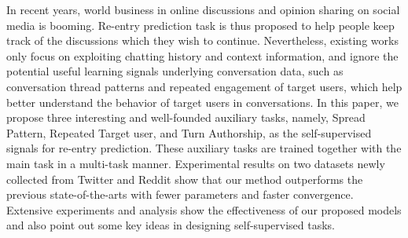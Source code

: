 In recent years, world business in online discussions and opinion sharing on social media is booming. Re-entry prediction task is thus proposed to help people keep track of the discussions which they wish to continue. Nevertheless, existing works only focus on exploiting chatting history and context information, and ignore the potential useful learning signals underlying conversation data, such as conversation thread patterns and repeated engagement of target users, which help better understand the behavior of target users in conversations. In this paper, we propose three interesting and well-founded auxiliary tasks, namely, Spread Pattern, Repeated Target user, and Turn Authorship, as the self-supervised signals for re-entry prediction. These auxiliary tasks are trained together with the main task in a multi-task manner. Experimental results on two datasets newly collected from Twitter and Reddit show that our method outperforms the previous state-of-the-arts with fewer parameters and faster convergence. Extensive experiments and analysis show the effectiveness of our proposed models and also point out some key ideas in designing self-supervised tasks.
